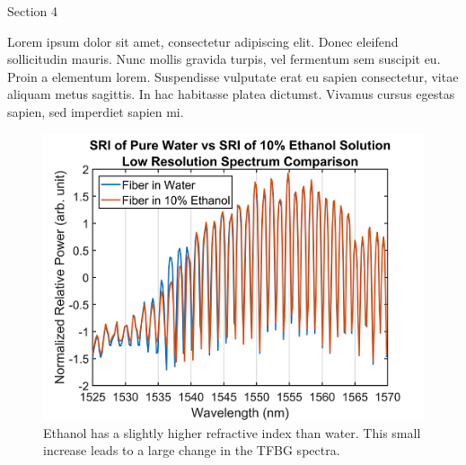 \documentclass[final]{beamer}
\newlength{\onecolwid}
\begin{document}
\begin{frame}[t]
\begin{columns}[t]
\begin{column}{\onecolwid}

\begin{block}{Section 4}

Lorem ipsum dolor sit amet, consectetur adipiscing elit. Donec eleifend sollicitudin mauris. Nunc mollis gravida turpis, vel fermentum sem suscipit eu. Proin a elementum lorem. Suspendisse vulputate erat eu sapien consectetur, vitae aliquam metus sagittis. In hac habitasse platea dictumst. Vivamus cursus egestas sapien, sed imperdiet sapien mi.

\end{block}
\vspace{-0.3in}

\begin{figure}
\includegraphics[width=1\linewidth]{Images/sri_spectrum_v2_LQ.png}
\caption{Ethanol has a slightly higher refractive index than water. This small increase leads to a large change in the TFBG spectra.}
\end{figure}
\vspace{-0.3in}



\end{column}
\end{columns}
\end{frame}
\end{document}

